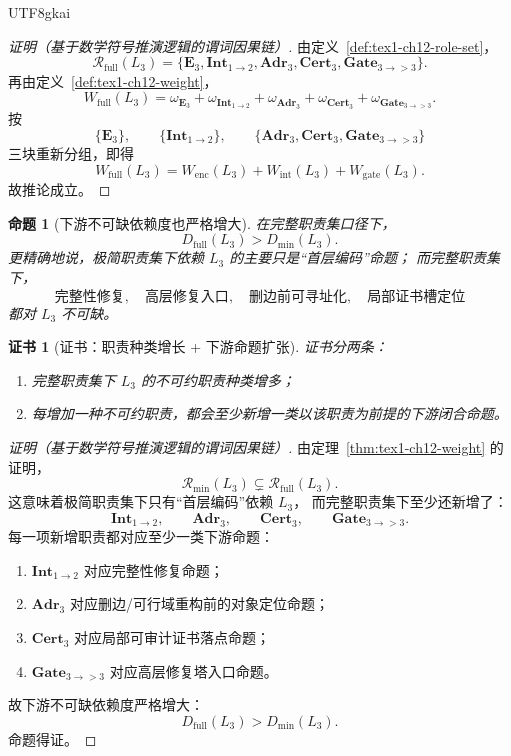 \documentclass[12pt]{article}
\newtheorem{proposition}{命题}[section]
\newtheorem{Certificate}{证书}[section]
\begin{document}
\begin{CJK*}{UTF8}{gkai}
\begin{proof}[证明（基于数学符号推演逻辑的谓词因果链）]
由定义~\ref{def:tex1-ch12-role-set}，
\[
  \mathcal R_{\mathrm{full}}(L_3)
  =
  \{\mathbf E_3,\mathbf{Int}_{1\to2},\mathbf{Adr}_3,\mathbf{Cert}_3,\mathbf{Gate}_{3\to >3}\}.
\]
再由定义~\ref{def:tex1-ch12-weight}，
\[
  W_{\mathrm{full}}(L_3)
  =
  \omega_{\mathbf E_3}
  +
  \omega_{\mathbf{Int}_{1\to2}}
  +
  \omega_{\mathbf{Adr}_3}
  +
  \omega_{\mathbf{Cert}_3}
  +
  \omega_{\mathbf{Gate}_{3\to >3}}.
\]
按
\[
  \{\mathbf E_3\},
  \qquad
  \{\mathbf{Int}_{1\to2}\},
  \qquad
  \{\mathbf{Adr}_3,\mathbf{Cert}_3,\mathbf{Gate}_{3\to >3}\}
\]
三块重新分组，即得
\[
  W_{\mathrm{full}}(L_3)
  =
  W_{\mathrm{enc}}(L_3)
  +
  W_{\mathrm{int}}(L_3)
  +
  W_{\mathrm{gate}}(L_3).
\]
故推论成立。
\end{proof}

\begin{proposition}[下游不可缺依赖度也严格增大]
\label{prop:tex1-ch12-depend}
在完整职责集口径下，
\[
  \boxed{
    D_{\mathrm{full}}(L_3)>D_{\mathrm{min}}(L_3).
  }
\]
更精确地说，极简职责集下依赖 \(L_3\) 的主要只是“首层编码”命题；
而完整职责集下，
\[
  \text{完整性修复},\quad
  \text{高层修复入口},\quad
  \text{删边前可寻址化},\quad
  \text{局部证书槽定位}
\]
都对 \(L_3\) 不可缺。
\end{proposition}

\begin{Certificate}[证书：职责种类增长 + 下游命题扩张]
\label{cert:tex1-ch12-depend}
证书分两条：
\begin{enumerate}
  \item 完整职责集下 \(L_3\) 的不可约职责种类增多；
  \item 每增加一种不可约职责，都会至少新增一类以该职责为前提的下游闭合命题。
\end{enumerate}
\end{Certificate}

\begin{proof}[证明（基于数学符号推演逻辑的谓词因果链）]
由定理~\ref{thm:tex1-ch12-weight} 的证明，
\[
  \mathcal R_{\mathrm{min}}(L_3)\subsetneq \mathcal R_{\mathrm{full}}(L_3).
\]
这意味着极简职责集下只有“首层编码”依赖 \(L_3\)，
而完整职责集下至少还新增了：
\[
  \mathbf{Int}_{1\to2},\qquad
  \mathbf{Adr}_3,\qquad
  \mathbf{Cert}_3,\qquad
  \mathbf{Gate}_{3\to >3}.
\]
每一项新增职责都对应至少一类下游命题：
\begin{enumerate}
  \item \(\mathbf{Int}_{1\to2}\) 对应完整性修复命题；
  \item \(\mathbf{Adr}_3\) 对应删边/可行域重构前的对象定位命题；
  \item \(\mathbf{Cert}_3\) 对应局部可审计证书落点命题；
  \item \(\mathbf{Gate}_{3\to >3}\) 对应高层修复塔入口命题。
\end{enumerate}
故下游不可缺依赖度严格增大：
\[
  D_{\mathrm{full}}(L_3)>D_{\mathrm{min}}(L_3).
\]
命题得证。
\end{proof}


\end{CJK*}
\end{document}
